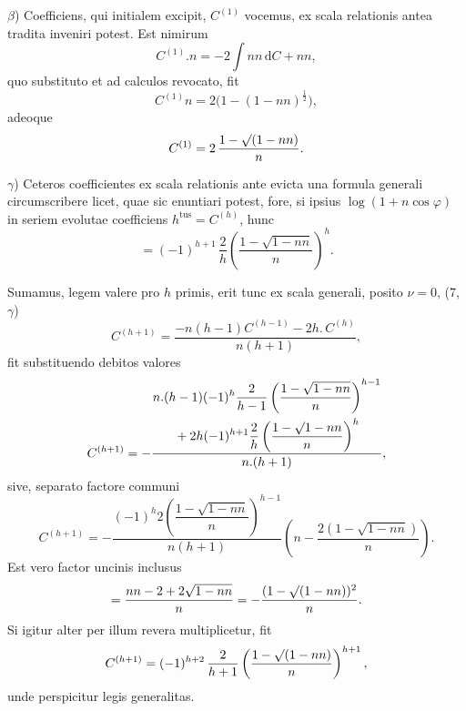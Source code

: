 $\beta$) Coefficiens, qui initialem excipit, $C^{(1)}$ vocemus, ex scala relationis antea
tradita inveniri potest. Est nimirum
\[
C^{(1)} .  n = -2\int nn\,\mathrm{d}C + nn,
\]
quo substituto et ad calculos revocato, fit
\[
C^{(1)}n = 2\bigl(1-(1-nn)^{\frac{1}{2}}\bigr),
\]
adeoque
\[
C^{(1)} = 2\,\frac{1-\mathord{\surd}(1-nn)}{n}.
\]
\par\noindent\hspace*{\parindent}$\gamma$) Ceteros coefficientes ex scala relationis ante evicta una formula generali
circumscribere licet, quae sic enuntiari potest, fore, si ipsius $\log(1+n\cos\varphi)$ in
seriem evolutae coefficiens $h^{\mathrm{tus}} = C^{(h)}$, hunc
\[
= (-1)^{h+1}\,\frac{2}{h}\left(\frac{1-\sqrt{1-nn}}{n}\right)^{h}.
\]
\par\noindent\hspace*{\parindent}Sumamus, legem valere pro $h$ primis, erit tunc ex scala generali, posito $\nu=0$, (7, $\gamma$)
\[
C^{(h+1)} = \frac{-n(h-1)C^{(h-1)}-2h.\,C^{(h)}}{n(h+1)}, 
\]
fit substituendo debitos valores
\[
C^{(h+1)} = -\frac{\begin{gathered}n.(h-1)(-1)^{h}\dfrac{2}{h-1}\left(\dfrac{1-\sqrt{1-nn}}{n}\right)^{h-1}\\{}+2h(-1)^{h+1}\dfrac{2}{h}\left(\dfrac{1-\mathord{\surd}1-nn}{n}\right)^{h}\end{gathered}}{n.(h+1)},
\]
sive, separato factore communi
\[
C^{(h+1)} = -\frac{(-1)^{h}2\left(\dfrac{1-\sqrt{1-nn}}{n}\right)^{h-1}}{n(h+1)}\left(n-\frac{2(1-\sqrt{1-nn})}{n}\right).
\]
Est vero factor uncinis inclusus
\[
= \frac{nn-2+2\sqrt{1-nn}}{n} = -\frac{(1-\mathord{\surd}(1-nn))^{2}}{n}.
\]
Si igitur alter per illum revera multiplicetur, fit
\[
C^{(h+1)} = (-1)^{h+2}\,\frac{2}{h+1}\left(\frac{1-\mathord{\surd}(1-nn)}{n}\right)^{h+1},
\]
unde perspicitur legis generalitas.

